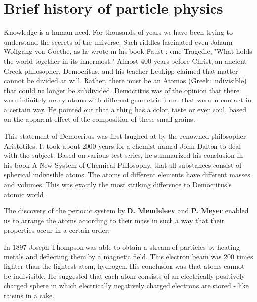 \section{Brief history of particle physics}
Knowledge is a human need. For thousands of years we have been trying to understand the secrets of the universe. Such riddles fascinated even Johann Wolfgang von Goethe, as he wrote in his book Faust \cite{goethe1921faust}; eine Tragedie, "What holds the world together in its innermost." 
Almost 400 years before Christ, an ancient Greek philosopher, Democritus, and his teacher Leukipp claimed that matter cannot be divided at will. Rather, there must be an Atomos (Greek: indivisible) that could no longer be subdivided.
Democritus was of the opinion that there were infinitely many atoms with different geometric forms that were in contact in a certain way. He pointed out that a thing has a color, taste or even soul, based on the apparent effect of the composition of these small grains.
\cite{capelle1968vorsokratiker}

This statement of Democritus was first laughed at by the renowned philosopher Aristotiles. It took about 2000 years for a chemist named John Dalton to deal with the subject. Based on various test series, he summarized his conclusion in his book A New System of Chemical Philosophy, that all substances consist of spherical indivisible atoms. The atoms of different elements have different masses and volumes. This was exactly the most striking difference to Democritus's atomic world.\cite{dalton2010new}

The discovery of the periodic system by \textbf{D. Mendeleev} and \textbf{P. Meyer} enabled us to arrange the atoms according to their mass in such a way that their properties occur in a certain order.\cite{haken2013atom}

In 1897 Joseph Thompson was able to obtain a stream of particles by heating metals and deflecting them by a magnetic field. This electron beam was 200 times lighter than the lightest atom, hydrogen.
His conclusion was that atoms cannot be indivisible. He suggested that each atom consists of an electrically positively charged sphere in which electrically negatively charged electrons are stored - like raisins in a cake.


